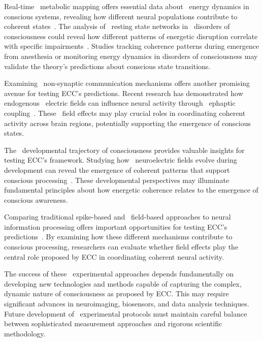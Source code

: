 Real-time~ metabolic mapping offers essential data about~ energy dynamics in conscious systems, revealing how different neural populations contribute to~ coherent states~\cite{Zhang2019}. The analysis of~ resting state networks in~ disorders of consciousness could reveal how different patterns of energetic disruption correlate with specific impairments~\cite{Fox2010}. Studies tracking coherence patterns during emergence from anesthesia or monitoring energy dynamics in disorders of consciousness may validate the theory's predictions about conscious state transitions.

Examining~ non-synaptic communication mechanisms offers another promising avenue for testing ECC's predictions. Recent research has demonstrated how endogenous~ electric fields can influence neural activity through~ ephaptic coupling~\cite{anastassiou2015ephaptic, chiang2019slow}. These~ field effects may play crucial roles in coordinating coherent activity across brain regions, potentially supporting the emergence of conscious states.

The~ developmental trajectory of consciousness provides valuable insights for testing ECC's framework. Studying how~ neuroelectric fields evolve during development can reveal the emergence of coherent patterns that support conscious processing~\cite{bosl2025dynamical}. These developmental perspectives may illuminate fundamental principles about how energetic coherence relates to the emergence of conscious awareness.

Comparing traditional spike-based and~ field-based approaches to neural information processing offers important opportunities for testing ECC's predictions~\cite{hunt2023fields}. By examining how these different mechanisms contribute to conscious processing, researchers can evaluate whether field effects play the central role proposed by ECC in coordinating coherent neural activity.

The success of these~ experimental approaches depends fundamentally on developing new technologies and methods capable of capturing the complex, dynamic nature of consciousness as proposed by ECC. This may require significant advances in neuroimaging, biosensors, and data analysis techniques. Future development of~ experimental protocols must maintain careful balance between sophisticated measurement approaches and rigorous scientific methodology.

